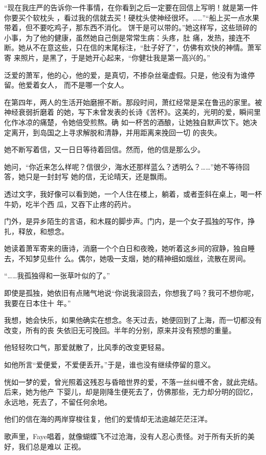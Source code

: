 \documentclass[12pt,a4paper]{article}
\begin{document}
		“现在我庄严的告诉你一件事情，在你看到之后一定要在回信上写明！就是第一件你要买个软枕头
	，看过我的信就去买！硬枕头使神经很坏。……”“船上买一点水果带着，但不要吃鸡子，那东西不消化。
	饼干是可以带的。”她这样写，这些琐碎的小事，为了他的健康，虽然她自己倒是常常生病：头疼，肚
	痛，发热，接连不断。她从不在意这些，只在信的末尾标注，“肚子好了”，仿佛有欢快的神情。萧军寄
	来照片，是黑了，于是她开心起来，“你健壮我是第一高兴的。”


		泛爱的萧军，他的心，他的爱，是真切，不掺杂丝毫虚假。只是，他没有为谁停留。他爱着女人，
	而不是哪一个女人。

		在第四年，两人的生活开始磨擦不断。那段时间，萧红经常是呆在鲁迅的家里。被神经衰弱折磨着
	的她，写下未曾发表的长诗《苦杯》。这美的，光明的爱，瞬间里化作冰凉的痛楚，令她倍受煎熬。确
	如一杯苦的酒酿，让她独自默声饮下。她决定离开，到岛国之上寻求解脱和清静，并用距离来挽回一切
	的丧失。


		她不断写着信，又一日日等待着回信。然而，他的信是那么少。

		她问，“你近来怎么样呢？信很少，海水还那样蓝么？透明么？……”她不等待回答，她只是一封封写
	她的信，无论晴天，还是飘雨。

		透过文字，我好像可以看到她，一个人住在楼上，躺着，或者歪斜在桌上，喝一杯牛奶，吃半个西
	瓜，又吞下止疼的药片。

		门外，是异乡陌生的言语，和木屐的脚步声。门内，是一个女子孤独的写作，挣扎，释放，和想念。

		她读着萧军寄来的唐诗，消磨一个个白日和夜晚，她听着这乡间的寂静，独自睡去，不知梦见些什
	么。偶尔，她吸一支烟，她的精神细如烟丝，流散在房间。

		“……我孤独得和一张草叶似的了。”

		即使是孤独，她依旧有点赌气地说“你说我滚回去，你想我了吗？我可不想你呢，我要在日本住十
	年。”

		我想，她会快乐，如果他确实在想念。冬天过去，她便回到了上海，而一切都没有改变，所有的丧
	失依旧无可挽回。半年的分别，原来并没有预想的重量。

		他轻轻吹口气，那爱就散了，比风季的改变更轻易。

		如他所言“爱便爱，不爱便丢开。”于是，谁也没有继续停留的意义。

		恍如一梦的爱，曾光照着这残忍与昏暗世界的爱，不落一丝纠缠不舍，就此完结。后来，她为他产
	下婴儿，却是刚降生便死去了，仿佛那些，无力却分明的回忆，永远地，死去了，不留任何余地。


		他们的信在海的两岸穿梭往复，他们的爱情却无法逾越茫茫汪洋。

		歌声里，Faye唱着，就像蝴蝶飞不过沧海，没有人忍心责怪。对于所有夭折的美好，我们总是难以
	正视。
\end{document}
